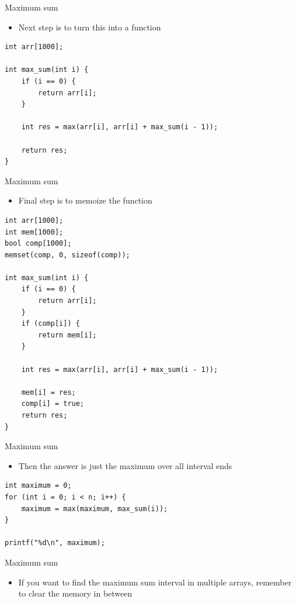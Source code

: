 \documentclass{beamer}
\begin{document}
\begin{frame}{Maximum sum}
    \begin{itemize}
        \item Next step is to turn this into a function
    \end{itemize}

    \begin{verbatim}
int arr[1000];

int max_sum(int i) {
    if (i == 0) {
        return arr[i];
    }

    int res = max(arr[i], arr[i] + max_sum(i - 1));

    return res;
}
    \end{verbatim}
\end{frame}

\begin{frame}{Maximum sum}
    \begin{itemize}
        \item Final step is to memoize the function
    \end{itemize}

    \begin{verbatim}
int arr[1000];
int mem[1000];
bool comp[1000];
memset(comp, 0, sizeof(comp));

int max_sum(int i) {
    if (i == 0) {
        return arr[i];
    }
    if (comp[i]) {
        return mem[i];
    }

    int res = max(arr[i], arr[i] + max_sum(i - 1));

    mem[i] = res;
    comp[i] = true;
    return res;
}
    \end{verbatim}
\end{frame}

\begin{frame}{Maximum sum}
    \begin{itemize}
        \item Then the answer is just the maximum over all interval ends
    \end{itemize}

    \begin{verbatim}
int maximum = 0;
for (int i = 0; i < n; i++) {
    maximum = max(maximum, max_sum(i));
}

printf("%d\n", maximum);
    \end{verbatim}
\end{frame}

\begin{frame}{Maximum sum}
    \vspace{40pt}
    \begin{itemize}
        \item If you want to find the maximum sum interval in multiple arrays, remember to clear the memory in between
    \end{itemize}
\end{frame}
\end{document}
